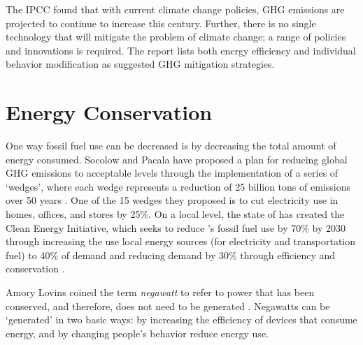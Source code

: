 The IPCC found that with current climate change policies, GHG emissions are projected to continue to increase this century. Further, there is no single technology that will mitigate the problem of climate change; a range of policies and innovations is required. The report lists both energy efficiency and individual behavior modification as suggested GHG mitigation strategies.



\section{Energy Conservation}

One way fossil fuel use can be decreased is by decreasing the total amount of energy consumed. Socolow and Pacala have proposed a plan for reducing global GHG emissions to acceptable levels through the implementation of a series of `wedges', where each wedge represents a reduction of 25 billion tons of \COtwo emissions over 50 years \cite{Socolow2008}. One of the 15 wedges they proposed is to cut electricity use in homes, offices, and stores by 25\%. On a local level, the state of \Hawaii has created the \Hawaii Clean Energy Initiative, which seeks to reduce \Hawaii's fossil fuel use by 70\% by 2030 through increasing the use local energy sources (for electricity and transportation fuel) to 40\% of demand and reducing demand by 30\% through efficiency and conservation \cite{HCEI-website}.

Amory Lovins coined the term \emph{negawatt} to refer to power that has been conserved, and therefore, does not need to be generated \cite{Kolbert2007Mr-Green}. Negawatts can be `generated' in two basic ways: by increasing the efficiency of devices that consume energy, and by changing people's behavior reduce energy use.


